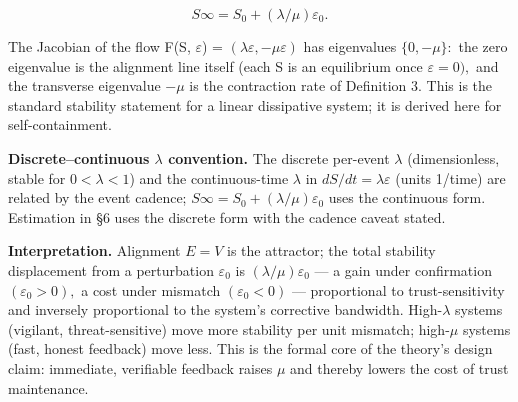 \documentclass[11pt,twocolumn]{article}
\theoremstyle{gttdef}
\theoremstyle{gttplain}
\begin{document}
\begin{equation}
S\infty = S_{0} + (\lambda/\mu)\varepsilon_{0}.
\label{eq:slimit}
\end{equation}

The Jacobian of the flow F(S, $\varepsilon$) = $(\lambda \varepsilon, -\mu \varepsilon)$ has eigenvalues $\{0, -\mu \}:$ the zero eigenvalue is the alignment line itself (each S is an equilibrium once $\varepsilon = 0),$ and the transverse eigenvalue $-\mu$ is the contraction rate of Definition 3. This is the standard stability statement for a linear dissipative system; it is derived here for self-containment.

\textbf{Discrete--continuous $\lambda$ convention.} The discrete per-event $\lambda$ (dimensionless, stable for $0 < \lambda < 1$) and the continuous-time $\lambda$ in $dS/dt = \lambda\varepsilon$ (units 1/time) are related by the event cadence; $S\infty = S_{0} + (\lambda/\mu)\varepsilon_{0}$ uses the continuous form. Estimation in \S{}6 uses the discrete form with the cadence caveat stated.

\textbf{Interpretation.} Alignment $E = V$ is the attractor; the total stability displacement from a perturbation $\varepsilon_{0}$ is $(\lambda/\mu)\varepsilon_{0}$ --- a gain under confirmation $(\varepsilon_{0} > 0),$ a cost under mismatch $(\varepsilon_{0} < 0)$ --- proportional to trust-sensitivity and inversely proportional to the system's corrective bandwidth. High-$\lambda$ systems (vigilant, threat-sensitive) move more stability per unit mismatch; high-$\mu$ systems (fast, honest feedback) move less. This is the formal core of the theory's design claim: immediate, verifiable feedback raises $\mu$ and thereby lowers the cost of trust maintenance.
\end{document}
